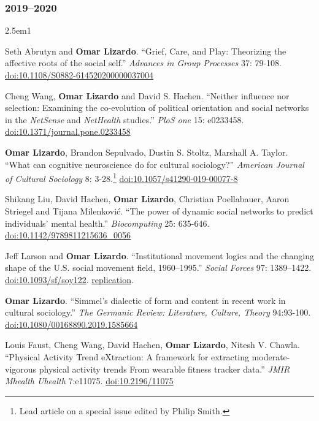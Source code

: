 \documentclass[
]{article}
\newenvironment{cventry}{\begin{hangparas}{2.5em}{1}}{\end{hangparas}}
\begin{document}
\subsubsection{2019--2020}\label{section-3}

\begin{cventry}

Seth Abrutyn and \textbf{Omar Lizardo}. ``Grief, Care, and Play:
Theorizing the affective roots of the social self.'' \emph{Advances in
Group Processes} 37: 79-108.
\href{https://doi.org/10.1108/S0882-614520200000037004}{doi:10.1108/S0882-614520200000037004}

Cheng Wang, \textbf{Omar Lizardo} and David S. Hachen. ``Neither
influence nor selection: Examining the co-evolution of political
orientation and social networks in the \emph{NetSense} and
\emph{NetHealth} studies.'' \emph{PloS one} 15: e0233458.
\href{https://doi.org/10.1371/journal.pone.0233458}{doi:10.1371/journal.pone.0233458}

\textbf{Omar Lizardo}, Brandon Sepulvado, Dustin S. Stoltz, Marshall A.
Taylor. ``What can cognitive neuroscience do for cultural sociology?''
\emph{American Journal of Cultural Sociology} 8: 3-28.\footnote{Lead
  article on a special issue edited by Philip Smith.}
\href{https://doi.org/10.1057/s41290-019-00077-8}{doi:10.1057/s41290-019-00077-8}

Shikang Liu, David Hachen, \textbf{Omar Lizardo}, Christian Poellabauer,
Aaron Striegel and Tijana Milenković. ``The power of dynamic social
networks to predict individuals' mental health.'' \emph{Biocomputing}
25: 635-646.
\href{https://doi.org/10.1142/9789811215636_0056}{doi:10.1142/9789811215636\_0056}

Jeff Larson and \textbf{Omar Lizardo}. ``Institutional movement logics
and the changing shape of the U.S. social movement field, 1960--1995.''
\emph{Social Forces} 97: 1389--1422.
\href{https://doi.org/10.1093/sf/soy122}{doi:10.1093/sf/soy122}.
\href{https://github.com/olizardo/larson-lizardo-institutional-movement-logics-SF}{
replication}.

\textbf{Omar Lizardo}. ``Simmel's dialectic of form and content in
recent work in cultural sociology.'' \emph{The Germanic Review:
Literature, Culture, Theory} 94:93-100.
\href{https://doi.org/10.1080/00168890.2019.1585664}{doi:10.1080/00168890.2019.1585664}

Louis Faust, Cheng Wang, David Hachen, \textbf{Omar Lizardo}, Nitesh V.
Chawla. ``Physical Activity Trend eXtraction: A framework for extracting
moderate-vigorous physical activity trends From wearable fitness tracker
data.'' \emph{JMIR Mhealth Uhealth} 7:e11075.
\href{https://doi.org/10.2196/11075}{doi:10.2196/11075}


\end{cventry}
\end{document}
